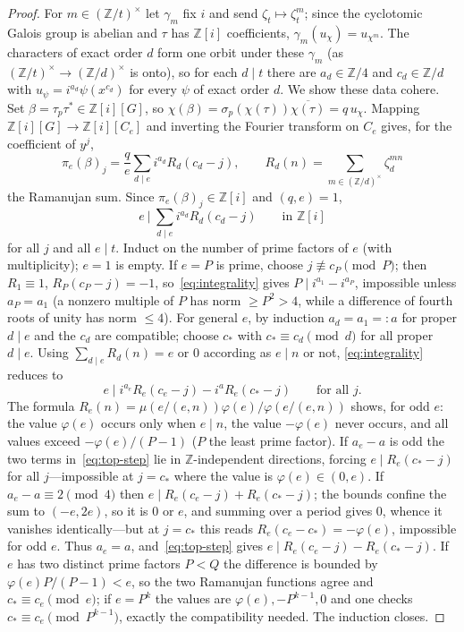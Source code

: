 \documentclass[11pt]{article}
\theoremstyle{plain}
\theoremstyle{definition}
\theoremstyle{remark}
\newcommand{\Z}{\mathbb Z}
\begin{document}
\begin{proof}
For $m\in(\Z/t)^\times$ let $\gamma_m$ fix $i$ and send $\zeta_t\mapsto\zeta_t^m$;
since the cyclotomic Galois group is abelian and $\tau$ has $\Z[i]$
coefficients, $\gamma_m(u_\chi)=u_{\chi^m}$. The characters of exact order $d$
form one orbit under these $\gamma_m$ (as $(\Z/t)^\times\to(\Z/d)^\times$ is
onto), so for each $d\mid t$ there are $a_d\in\Z/4$ and $c_d\in\Z/d$ with
$u_\psi=i^{a_d}\psi(x^{c_d})$ for every $\psi$ of exact order $d$. We show these
data cohere. Set $\beta=\tau_p\tau^*\in\Z[i][G]$, so
$\chi(\beta)=\sigma_p(\chi(\tau))\overline{\chi(\tau)}=q\,u_\chi$. Mapping
$\Z[i][G]\to\Z[i][C_e]$ and inverting the Fourier transform on $C_e$ gives, for
the coefficient of $y^j$,
\[
  \pi_e(\beta)_j=\frac qe\sum_{d\mid e}i^{a_d}R_d(c_d-j),\qquad
  R_d(n)=\sum_{m\in(\Z/d)^\times}\zeta_d^{mn}
\]
the Ramanujan sum. Since $\pi_e(\beta)_j\in\Z[i]$ and $(q,e)=1$,
\begin{equation}\label{eq:integrality}
  e\ \Big|\ \sum_{d\mid e}i^{a_d}R_d(c_d-j)\qquad\text{in }\Z[i]
\end{equation}
for all $j$ and all $e\mid t$. Induct on the number of prime factors of $e$
(with multiplicity); $e=1$ is empty. If $e=P$ is prime, choose $j\not\equiv
c_P\pmod P$; then $R_1\equiv1$, $R_P(c_P-j)=-1$, so~\eqref{eq:integrality}
gives $P\mid i^{a_1}-i^{a_P}$, impossible unless $a_P=a_1$ (a nonzero multiple
of $P$ has norm $\ge P^2>4$, while a difference of fourth roots of unity has
norm $\le4$). For general $e$, by induction $a_d=a_1=:a$ for proper $d\mid e$
and the $c_d$ are compatible; choose $c_*$ with $c_*\equiv c_d\pmod d$ for all
proper $d\mid e$. Using $\sum_{d\mid e}R_d(n)=e$ or $0$ according as $e\mid n$
or not, \eqref{eq:integrality} reduces to
\begin{equation}\label{eq:top-step}
  e\mid i^{a_e}R_e(c_e-j)-i^aR_e(c_*-j)\qquad\text{for all }j.
\end{equation}
The formula $R_e(n)=\mu(e/(e,n))\varphi(e)/\varphi(e/(e,n))$ shows, for odd $e$:
the value $\varphi(e)$ occurs only when $e\mid n$, the value $-\varphi(e)$ never
occurs, and all values exceed $-\varphi(e)/(P-1)$ ($P$ the least prime factor).
If $a_e-a$ is odd the two terms in~\eqref{eq:top-step} lie in $\Z$-independent
directions, forcing $e\mid R_e(c_*-j)$ for all $j$---impossible at $j=c_*$ where
the value is $\varphi(e)\in(0,e)$. If $a_e-a\equiv2\pmod4$ then $e\mid
R_e(c_e-j)+R_e(c_*-j)$; the bounds confine the sum to $(-e,2e)$, so it is $0$ or
$e$, and summing over a period gives $0$, whence it vanishes identically---but
at $j=c_*$ this reads $R_e(c_e-c_*)=-\varphi(e)$, impossible for odd $e$. Thus
$a_e=a$, and~\eqref{eq:top-step} gives $e\mid R_e(c_e-j)-R_e(c_*-j)$. If $e$ has
two distinct prime factors $P<Q$ the difference is bounded by
$\varphi(e)P/(P-1)<e$, so the two Ramanujan functions agree and $c_*\equiv
c_e\pmod e$; if $e=P^k$ the values are $\varphi(e),-P^{k-1},0$ and one checks
$c_*\equiv c_e\pmod{P^{k-1}}$, exactly the compatibility needed. The induction
closes.
\end{proof}
\end{document}
